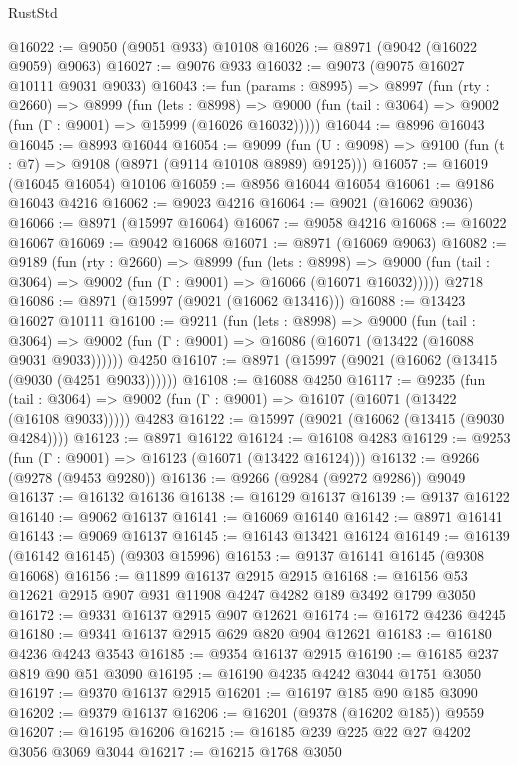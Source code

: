 \begin{lexlean}{RustStd}
\begin{coremodule}
@16022 := @9050 (@9051 @933) @10108
@16026 := @8971 (@9042 (@16022 @9059) @9063)
@16027 := @9076 @933
@16032 := @9073 (@9075 @16027 @10111 @9031 @9033)
@16043 := fun (params : @8995) =>
  @8997
    (fun (rty : @2660) =>
    @8999
      (fun (lets : @8998) =>
      @9000 (fun (tail : @3064) => @9002 (fun (Γ : @9001) => @15999 (@16026 @16032)))))
@16044 := @8996 @16043
@16045 := @8993 @16044
@16054 := @9099
    (fun (U : @9098) => @9100 (fun (t : @7) => @9108 (@8971 (@9114 @10108 @8989) @9125)))
@16057 := @16019 (@16045 @16054) @10106
@16059 := @8956 @16044 @16054
@16061 := @9186 @16043 @4216
@16062 := @9023 @4216
@16064 := @9021 (@16062 @9036)
@16066 := @8971 (@15997 @16064)
@16067 := @9058 @4216
@16068 := @16022 @16067
@16069 := @9042 @16068
@16071 := @8971 (@16069 @9063)
@16082 := @9189
    (fun (rty : @2660) =>
    @8999
      (fun (lets : @8998) =>
      @9000 (fun (tail : @3064) => @9002 (fun (Γ : @9001) => @16066 (@16071 @16032)))))
    @2718
@16086 := @8971 (@15997 (@9021 (@16062 @13416)))
@16088 := @13423 @16027 @10111
@16100 := @9211
    (fun (lets : @8998) =>
    @9000
      (fun (tail : @3064) =>
      @9002 (fun (Γ : @9001) => @16086 (@16071 (@13422 (@16088 @9031 @9033))))))
    @4250
@16107 := @8971 (@15997 (@9021 (@16062 (@13415 (@9030 (@4251 @9033))))))
@16108 := @16088 @4250
@16117 := @9235
    (fun (tail : @3064) => @9002 (fun (Γ : @9001) => @16107 (@16071 (@13422 (@16108 @9033)))))
    @4283
@16122 := @15997 (@9021 (@16062 (@13415 (@9030 @4284))))
@16123 := @8971 @16122
@16124 := @16108 @4283
@16129 := @9253 (fun (Γ : @9001) => @16123 (@16071 (@13422 @16124)))
@16132 := @9266 (@9278 (@9453 @9280))
@16136 := @9266 (@9284 (@9272 @9286)) @9049
@16137 := @16132 @16136
@16138 := @16129 @16137
@16139 := @9137 @16122
@16140 := @9062 @16137
@16141 := @16069 @16140
@16142 := @8971 @16141
@16143 := @9069 @16137
@16145 := @16143 @13421 @16124
@16149 := @16139 (@16142 @16145) (@9303 @15996)
@16153 := @9137 @16141 @16145 (@9308 @16068)
@16156 := @11899 @16137 @2915 @2915
@16168 := @16156 @53 @12621 @2915 @907 @931 @11908 @4247 @4282 @189 @3492 @1799 @3050
@16172 := @9331 @16137 @2915 @907 @12621
@16174 := @16172 @4236 @4245
@16180 := @9341 @16137 @2915 @629 @820 @904 @12621
@16183 := @16180 @4236 @4243 @3543
@16185 := @9354 @16137 @2915
@16190 := @16185 @237 @819 @90 @51 @3090
@16195 := @16190 @4235 @4242 @3044 @1751 @3050
@16197 := @9370 @16137 @2915
@16201 := @16197 @185 @90 @185 @3090
@16202 := @9379 @16137
@16206 := @16201 (@9378 (@16202 @185)) @9559
@16207 := @16195 @16206
@16215 := @16185 @239 @225 @22 @27 @4202 @3056 @3069 @3044
@16217 := @16215 @1768 @3050

\end{coremodule}
\end{lexlean}
